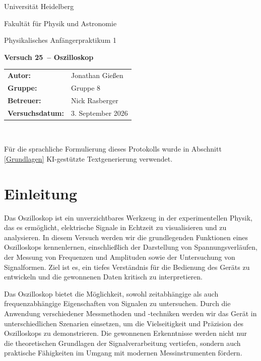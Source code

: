 \documentclass[12pt,a4paper,titlepage]{scrartcl}
\numberwithin{equation}{section}
\numberwithin{table}{section}
\numberwithin{figure}{section}
\newcommand{\versuch}{Versuch 25}
\newcommand{\titel}{Oszilloskop}
\newcommand{\praktikum}{Physikalisches Anfängerpraktikum 1}
\newcommand{\autor}{Jonathan Gießen}
\newcommand{\gruppe}{Gruppe 8}
\newcommand{\datum}{3. September 2026}
\newcommand{\betreuer}{Nick Rasberger}
\begin{document}
\pagestyle{scrheadings}

\begin{titlepage}



    \centering
    \vspace*{4cm}
    {\large Universität Heidelberg\par}
    {\small Fakultät für Physik und Astronomie\par}
    {\Large \praktikum\par}
    \vspace{0.8cm}
    {\LARGE \bfseries \versuch\ -- \titel\par}
    \vspace{1.5cm}

    \begin{tabular}{ll}
        \textbf{Autor:} & \autor\\
        \textbf{Gruppe:} & \gruppe\\
        \textbf{Betreuer:} & \betreuer\\
        \textbf{Versuchsdatum:} & \datum\\
    \end{tabular}

    \vfill
    \hrulefill\
\end{titlepage}

\tableofcontents

\bigskip
\begin{tcolorbox}[colback=gray!5,colframe=gray!60,boxrule=0.8pt,arc=0.01mm,title=KI-Hinweis]
    Für die sprachliche Formulierung dieses Protokolls wurde in Abschnitt \ref{Grundlagen} KI-gestützte Textgenerierung verwendet. 
\end{tcolorbox}
\clearpage
\section{Einleitung}
Das Oszilloskop ist ein unverzichtbares Werkzeug in der experimentellen Physik, das es ermöglicht, elektrische Signale in Echtzeit zu visualisieren und zu analysieren. In diesem Versuch werden wir die grundlegenden Funktionen eines Oszilloskops kennenlernen, einschließlich der Darstellung von Spannungsverläufen, der Messung von Frequenzen und Amplituden sowie der Untersuchung von Signalformen. Ziel ist es, ein tiefes Verständnis für die Bedienung des Geräts zu entwickeln und die gewonnenen Daten kritisch zu interpretieren.

Das Oszilloskop bietet die Möglichkeit, sowohl zeitabhängige als auch frequenzabhängige Eigenschaften von Signalen zu untersuchen. Durch die Anwendung verschiedener Messmethoden und -techniken werden wir das Gerät in unterschiedlichen Szenarien einsetzen, um die Vielseitigkeit und Präzision des Oszilloskops zu demonstrieren. Die gewonnenen Erkenntnisse werden nicht nur die theoretischen Grundlagen der Signalverarbeitung vertiefen, sondern auch praktische Fähigkeiten im Umgang mit modernen Messinstrumenten fördern.
\end{document}
